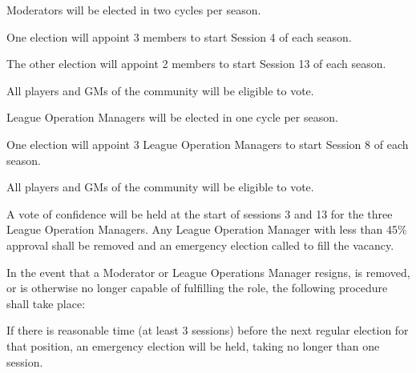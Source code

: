 \begin{deepEnumerate}
\begin{deepEnumerate}
	\end{deepEnumerate}
	\item Moderators will be elected in two cycles per season.
	\begin{deepEnumerate}
		\item One election will appoint 3 members to start Session 4 of each season.
		\item The other election will appoint 2 members to start Session 13 of each season.
		\item All players and GMs of the community will be eligible to vote.
	\end{deepEnumerate}
	\item League Operation Managers will be elected in one cycle per season.
	\begin{deepEnumerate}
		\item One election will appoint 3 League Operation Managers to start Session 8 of each season.
		\item All players and GMs of the community will be eligible to vote.
		\item A vote of confidence will be held at the start of sessions 3 and 13 for the three League Operation Managers. Any League Operation Manager with less than
		 45\% approval shall be removed and an emergency election called to fill the vacancy.
	\end{deepEnumerate}
	\item In the event that a Moderator or League Operations Manager resigns, is removed, or is otherwise no longer capable of fulfilling the role, the following
	procedure shall take place: 
	\begin{deepEnumerate}
		\item If there is reasonable time (at least 3 sessions) before the next regular election for that position, an emergency election will be held, taking no longer than one session. 
	

\end{deepEnumerate}
\end{deepEnumerate}
